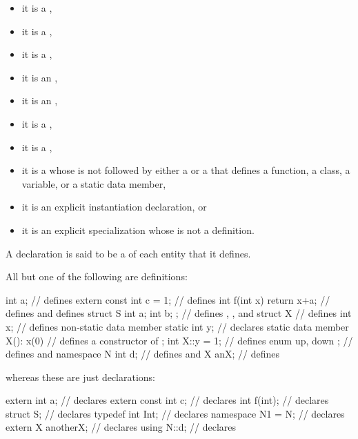 \begin{itemize}
\item it is
a ,
\item it is
a ,
\item it is
a ,
\item
it is an
,
\item
it is an
,
\item it is
a ,
\item it is
a ,
\item it is
a 
whose  is not followed by
either a  or a 
that defines a function, a class, a variable, or a static data member,
\item it is
an explicit instantiation declaration, or
\item it is
an explicit specialization whose
 is not a definition.
\end{itemize}
A declaration is said to be a  of each entity that it defines.
\begin{example}
All but one of the following are definitions:
\begin{codeblock}
int a;                          // defines 
extern const int c = 1;         // defines 
int f(int x) { return x+a; }    // defines  and defines 
struct S { int a; int b; };     // defines , , and 
struct X {                      // defines 
  int x;                        // defines non-static data member 
  static int y;                 // declares static data member 
  X(): x(0) { }                 // defines a constructor of 
};
int X::y = 1;                   // defines 
enum { up, down };              // defines  and 
namespace N { int d; }          // defines  and 
X anX;                          // defines 

\end{codeblock}
whereas these are just declarations:
\begin{codeblock}
extern int a;                   // declares 
extern const int c;             // declares 
int f(int);                     // declares 
struct S;                       // declares 
typedef int Int;                // declares 
namespace N1 = N;               // declares 
extern X anotherX;              // declares 
using N::d;                     // declares 
\end{codeblock}
\end{example}

